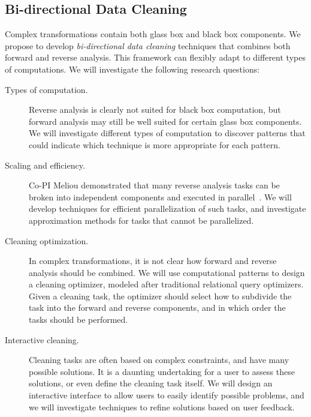 \subsection{Bi-directional Data Cleaning} %
\label{sub:bi_directional_data_cleaning}
Complex transformations contain both glass box and black box components. We propose to develop \emph{bi-directional data cleaning} techniques that combines both forward and reverse analysis. This framework can flexibly adapt to different types of computations. We will investigate the following research questions:
\begin{description}
	\item[Types of computation.] Reverse analysis is clearly not suited for black box computation, but forward analysis may still be well suited for certain glass box components. We will investigate different types of computation to discover patterns that could indicate which technique is more appropriate for each pattern.
	\item[Scaling and efficiency.] Co-PI Meliou demonstrated that many reverse analysis tasks can be broken into independent components and executed in parallel~\cite{DBLP:conf/sigmod/MeliouS12}. We will develop techniques for efficient parallelization of such tasks, and investigate approximation methods for tasks that cannot be parallelized.
	\item[Cleaning optimization.] In complex transformations, it is not clear how forward and reverse analysis should be combined. We will use computational patterns to design a cleaning optimizer, modeled after traditional relational query optimizers. Given a cleaning task, the optimizer should select how to subdivide the task into the forward and reverse components, and in which order the tasks should be performed.
	\item[Interactive cleaning.] Cleaning tasks are often based on complex constraints, and have many possible solutions. It is a daunting undertaking for a user to assess these solutions, or even define the cleaning task itself.  We will design an interactive interface to allow users to easily identify possible problems, and we will investigate techniques to refine solutions based on user feedback.
\end{description}





